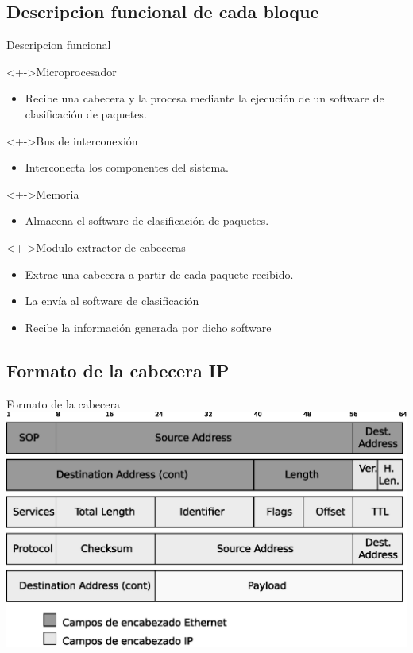 \documentclass[xcolor=dvipsnames]{beamer}
\begin{document}
\subsection{Descripcion funcional de cada bloque}
\begin{frame}{Descripcion funcional}
\begin{block}<+->{Microprocesador}   
    \begin{itemize}
      \scriptsize
     	\item Recibe una cabecera y la procesa mediante la ejecución de un software de clasificación de paquetes.
    \end{itemize}
  \end{block}
  \begin{block}<+->{Bus de interconexión}   
    \begin{itemize}
      \scriptsize
     	\item Interconecta los componentes del sistema. 
    \end{itemize}
  \end{block}
\begin{block}<+->{Memoria}   
    \begin{itemize}
      \scriptsize
     	\item Almacena el software de clasificación de paquetes.
    \end{itemize}
  \end{block}
  \begin{block}<+->{Modulo extractor de cabeceras}   
    \begin{itemize}
      \scriptsize
     	\item Extrae una cabecera a partir de cada paquete recibido.
	\item La envía al software de clasificación
	\item Recibe la información generada por dicho software
    \end{itemize}
  \end{block}
\end{frame}

\subsection{Formato de la cabecera IP}
\begin{frame}{Formato de la cabecera}
 \center 
\includegraphics[scale=0.55]{figures/cabecera.eps}
\end{frame}
\end{document}
